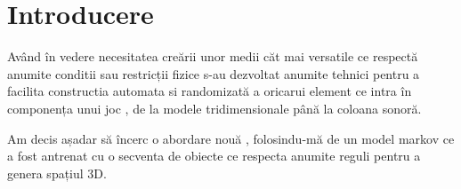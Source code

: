 \chapter*{Introducere} 

Având în vedere necesitatea creării unor medii căt mai versatile ce respectă anumite conditii sau restricții fizice s-au dezvoltat anumite tehnici pentru a facilita constructia automata si randomizată a oricarui element ce intra în componența unui joc , de la modele tridimensionale până la coloana sonoră.\par

Am decis așadar să încerc o abordare nouă , folosindu-mă de un model markov ce a fost antrenat cu o secventa de obiecte ce respecta anumite reguli pentru a genera spațiul 3D.